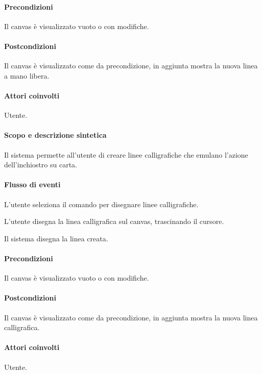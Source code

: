 \paragraph{Precondizioni} Il canvas \`e visualizzato vuoto o con modifiche.
\paragraph{Postcondizioni} Il canvas \`e visualizzato come da precondizione, in aggiunta mostra la nuova linea a mano libera.

\paragraph{Attori coinvolti} Utente.
\paragraph{Scopo e descrizione sintetica} 
Il sistema permette all'utente di creare linee calligrafiche che emulano l'azione dell'inchiostro su carta.
\paragraph{Flusso di eventi}
\begin{elenconumerato}[\textbf{}]{\subsubsecindent}
\item L'utente seleziona il comando per disegnare linee calligrafiche.
\item L'utente disegna la linea calligrafica sul canvas, trascinando il cursore.
\item Il sistema disegna la linea creata.
\end{elenconumerato}
\paragraph{Precondizioni} Il canvas \`e visualizzato vuoto o con modifiche.
\paragraph{Postcondizioni} Il canvas \`e visualizzato come da precondizione, in aggiunta mostra la nuova linea calligrafica.

\paragraph{Attori coinvolti} Utente.
